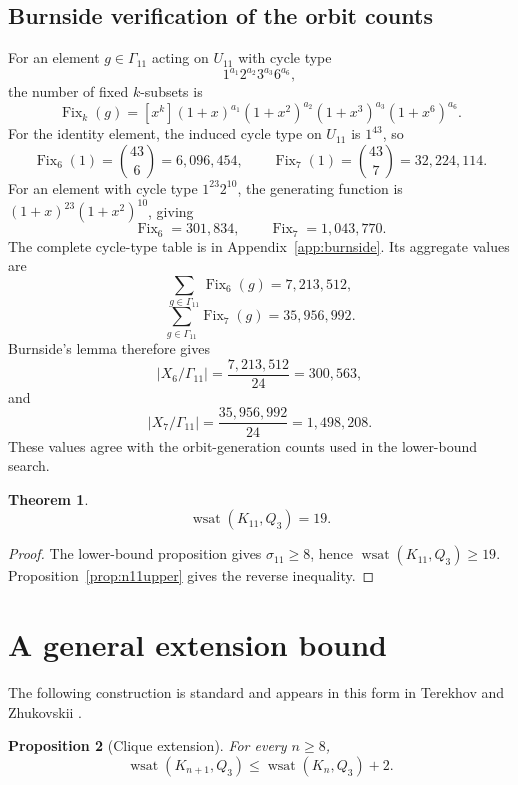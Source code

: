 \documentclass[11pt]{article}
\numberwithin{equation}{section}
\newtheorem{theorem}{Theorem}[section]
\newtheorem{proposition}[theorem]{Proposition}
\newcommand{\wsat}{\operatorname{wsat}}
\begin{document}
\subsection{Burnside verification of the orbit counts}\label{sec:burnside}
For an element $g\in\Gamma_{11}$ acting on $U_{11}$ with cycle type
\[
1^{a_1}2^{a_2}3^{a_3}6^{a_6},
\]
the number of fixed $k$-subsets is
\[
\operatorname{Fix}_k(g)
=[x^k](1+x)^{a_1}(1+x^2)^{a_2}(1+x^3)^{a_3}(1+x^6)^{a_6}.
\tag{6.3}
\]
For the identity element, the induced cycle type on $U_{11}$ is $1^{43}$, so
\[
\operatorname{Fix}_6(1)=\binom{43}{6}=6,096,454,
\qquad
\operatorname{Fix}_7(1)=\binom{43}{7}=32,224,114.
\]
For an element with cycle type $1^{23}2^{10}$, the generating function is
$(1+x)^{23}(1+x^2)^{10}$, giving
\[
\operatorname{Fix}_6=301,834,
\qquad
\operatorname{Fix}_7=1,043,770.
\]
The complete cycle-type table is in Appendix~\ref{app:burnside}. Its aggregate values are
\[
\sum_{g\in\Gamma_{11}}\operatorname{Fix}_6(g)=7,213,512,
\]
\[
\sum_{g\in\Gamma_{11}}\operatorname{Fix}_7(g)=35,956,992.
\]
Burnside's lemma therefore gives
\[
|X_6/\Gamma_{11}|=\frac{7,213,512}{24}=300,563,
\tag{6.4}
\]
and
\[
|X_7/\Gamma_{11}|=\frac{35,956,992}{24}=1,498,208.
\tag{6.5}
\]
These values agree with the orbit-generation counts used in the lower-bound search.

\begin{theorem}\label{thm:n11}
\[
\boxed{\wsat(K_{11},Q_3)=19.}
\]
\end{theorem}

\begin{proof}
The lower-bound proposition gives $\sigma_{11}\ge8$, hence $\wsat(K_{11},Q_3)\ge19$. Proposition~\ref{prop:n11upper} gives the reverse inequality.
\end{proof}

\section{A general extension bound}\label{sec:extension}
The following construction is standard and appears in this form in Terekhov and Zhukovskii \cite{TZ2025}.

\begin{proposition}[Clique extension]\label{prop:extension}
For every $n\ge8$,
\[
\wsat(K_{n+1},Q_3)\le \wsat(K_n,Q_3)+2.
\tag{7.1}
\]
\end{proposition}
\end{document}
